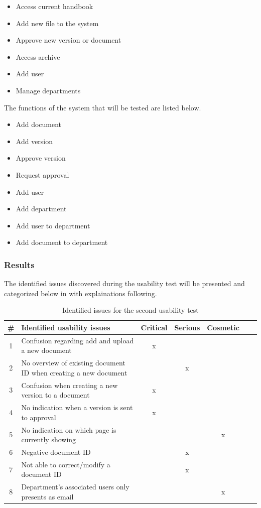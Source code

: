 \begin{itemize}
	\item Access current handbook
	\item Add new file to the system
	\item Approve new version or document
	\item Access archive
	\item Add user
	\item Manage departments
\end{itemize}

The functions of the system that will be tested are listed below.

\begin{itemize}
	\item Add document
	\item Add version
	\item Approve version
	\item Request approval
	\item Add user
	\item Add department
	\item Add user to department
	\item Add document to department
\end{itemize}

\subsubsection*{Results}
The identified issues discovered during the usability test will be presented and categorized below in  with explainations following.

\begin{table}[H]
	\begin{center}
	\begin{tabular}{| c | m{21em} | c | c | c | c | c |}
		\hline
		\# & \textbf{Identified usability issues} & Critical  & Serious & Cosmetic \\
		\hline
		 1 & Confusion regarding add and upload a new document   & x &  &  \\
		\hline
		 2 & No overview of existing document ID when creating a new document &  & x & \\
		\hline
		 3 & Confusion when creating a new version to a document & x & &  \\
		\hline
		4 & No indication when a version is sent to approval & x & & \\
		\hline
		5 & No indication on which page is currently showing &  &  & x \\
		\hline
		6 & Negative document ID &  & x & \\
		\hline
		7 & Not able to correct/modify a document ID & & x &  \\
		\hline
		8 & Department's associated users only presents as email &  &  & x \\
		\hline
	\end{tabular}
	\end{center}
	\caption{Identified issues for the second usability test}\label{tab:utest2}
\end{table}

